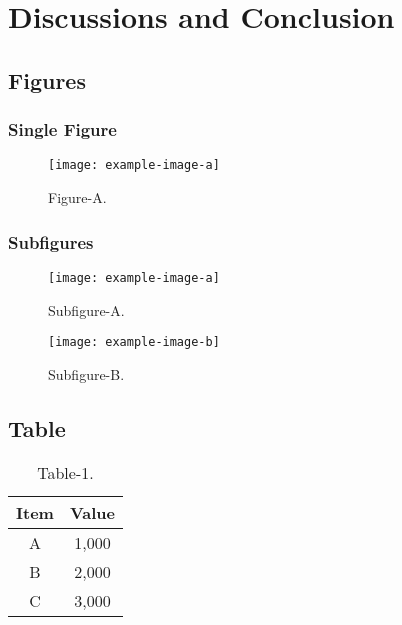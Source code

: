 
\let\clearpage\relax
\chapter{Discussions and Conclusion}

\blindtext

\section{Figures}

\subsection{Single Figure}

\begin{figure}[!htp]
    \centering
    \texttt{[image: example-image-a]}
    \caption{Figure-A.}
    \label{fig:a}
\end{figure}

\subsection{Subfigures}

\begin{figure}[!htp]
    \begin{minipage}{0.48\textwidth}
        \centering
        \texttt{[image: example-image-a]}
        \caption{Subfigure-A.}
        \label{fig:sub_a}
    \end{minipage}\hfill
    \begin{minipage}{0.48\textwidth}
        \centering
        \texttt{[image: example-image-b]}
        \caption{Subfigure-B.}
        \label{fig:sub_b}
    \end{minipage}
\end{figure}

\section{Table}

\begin{table}[!htp]
    \begin{center}
    \caption{Table-1.}
    \label{tab:tab-1}
        \begin{tabular}{cc}
            \toprule
                Item   &   Value \\
            \midrule
                A      &   1,000 \\
                B      &   2,000 \\
                C      &   3,000 \\
            \bottomrule
        \end{tabular}
    \end{center}
\end{table}

